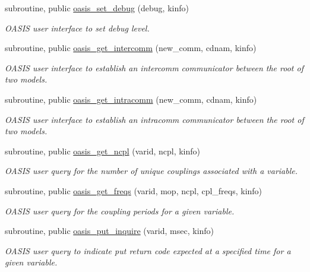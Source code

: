 \begin{DoxyCompactItemize}
subroutine, public \hyperlink{namespacemod__oasis__auxiliary__routines_a71bf70a87b2d4ce86016bbb93d9edd73}{oasis\+\_\+set\+\_\+debug} (debug, kinfo)
\begin{DoxyCompactList}\small\item\em O\+A\+S\+IS user interface to set debug level. \end{DoxyCompactList}\item 
subroutine, public \hyperlink{namespacemod__oasis__auxiliary__routines_a589021c0f1427f8e5edb1c7efcd7fa2c}{oasis\+\_\+get\+\_\+intercomm} (new\+\_\+comm, cdnam, kinfo)
\begin{DoxyCompactList}\small\item\em O\+A\+S\+IS user interface to establish an intercomm communicator between the root of two models. \end{DoxyCompactList}\item 
subroutine, public \hyperlink{namespacemod__oasis__auxiliary__routines_aa1959db40e8c27dea289b97458929526}{oasis\+\_\+get\+\_\+intracomm} (new\+\_\+comm, cdnam, kinfo)
\begin{DoxyCompactList}\small\item\em O\+A\+S\+IS user interface to establish an intracomm communicator between the root of two models. \end{DoxyCompactList}\item 
subroutine, public \hyperlink{namespacemod__oasis__auxiliary__routines_a154d3345ef9691e378afdc871086f7eb}{oasis\+\_\+get\+\_\+ncpl} (varid, ncpl, kinfo)
\begin{DoxyCompactList}\small\item\em O\+A\+S\+IS user query for the number of unique couplings associated with a variable. \end{DoxyCompactList}\item 
subroutine, public \hyperlink{namespacemod__oasis__auxiliary__routines_a62d1c98c05bcc4bd5e8796866bcce2db}{oasis\+\_\+get\+\_\+freqs} (varid, mop, ncpl, cpl\+\_\+freqs, kinfo)
\begin{DoxyCompactList}\small\item\em O\+A\+S\+IS user query for the coupling periods for a given variable. \end{DoxyCompactList}\item 
subroutine, public \hyperlink{namespacemod__oasis__auxiliary__routines_a7a95eb579171b6c2f06ff532c7823e2e}{oasis\+\_\+put\+\_\+inquire} (varid, msec, kinfo)
\begin{DoxyCompactList}\small\item\em O\+A\+S\+IS user query to indicate put return code expected at a specified time for a given variable. \end{DoxyCompactList}\end{DoxyCompactItemize}
